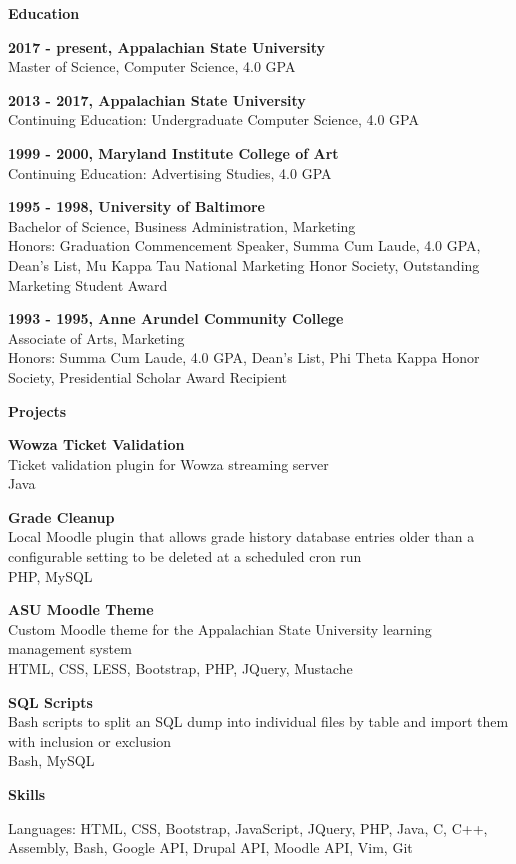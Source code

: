 \documentclass[letterpaper,10pt,final]{memoir}
\newcommand{\Sep}{\vspace{1.5em}}
\newcommand{\SmallSep}{\vspace{0.5em}}
\newcommand{\CVSection}[1]
	{\Large\textbf{#1}\par
	\SmallSep\normalsize\normalfont}
\newcommand{\CVItem}[1]
	{\textbf{\color{BrickRed} #1}}
\begin{document}
\clearpage
\framebreak
\framebreak

\CVSection{Education}
\CVItem{2017 - present, Appalachian State University}\\
Master of Science, Computer Science, 4.0 GPA
\SmallSep

\CVItem{2013 - 2017, Appalachian State University}\\
Continuing Education: Undergraduate Computer Science, 4.0 GPA
\SmallSep

\CVItem{1999 - 2000, Maryland Institute College of Art}\\
Continuing Education: Advertising Studies, 4.0 GPA
\SmallSep

\CVItem{1995 - 1998, University of Baltimore}\\
Bachelor of Science, Business Administration, Marketing\\
Honors: Graduation Commencement Speaker, Summa Cum Laude, 4.0 GPA, Dean's List, Mu Kappa Tau National Marketing Honor Society, Outstanding Marketing Student Award
\SmallSep

\CVItem{1993 - 1995, Anne Arundel Community College}\\
Associate of Arts, Marketing\\
Honors: Summa Cum Laude, 4.0 GPA, Dean's List, Phi Theta Kappa Honor Society, Presidential Scholar Award Recipient
\Sep

\CVSection{Projects}
\CVItem{Wowza Ticket Validation}\\
Ticket validation plugin for Wowza streaming server\\
Java
\SmallSep

\CVItem{Grade Cleanup}\\
Local Moodle plugin that allows grade history database entries older than a configurable setting to be deleted at a scheduled cron run\\
PHP, MySQL
\SmallSep

\CVItem{ASU Moodle Theme}\\
Custom Moodle theme for the Appalachian State University learning management system\\
HTML, CSS, LESS, Bootstrap, PHP, JQuery, Mustache
\SmallSep

\CVItem{SQL Scripts}\\
Bash scripts to split an SQL dump into individual files by table and import them with inclusion or exclusion\\
Bash, MySQL
\Sep

\CVSection{Skills}
Languages: HTML, CSS, Bootstrap, JavaScript, JQuery, PHP, Java, C, C++, Assembly, Bash, Google API, Drupal API, Moodle API, Vim, Git
\SmallSep
\end{document}

